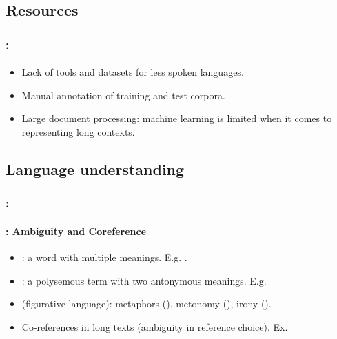 \documentclass[xcolor=table]{beamer}
\begin{document}
\subsection{Resources}

\begin{frame}
	\frametitle{\insertshortsubtitle: \insertsection}
	\framesubtitle{\insertsubsection}

	\begin{itemize}
		\item Lack of tools and datasets for less spoken languages.
		\item Manual annotation of training and test corpora.
		\item Large document processing: machine learning is limited when it comes to representing long contexts.
	\end{itemize}

\end{frame}

\subsection{Language understanding}

\begin{frame}
	\frametitle{\insertshortsubtitle: \insertsection}
	\framesubtitle{\insertsubsection: Ambiguity and Coreference}

	\begin{itemize}
		\item {}: a word with multiple meanings.
		E.g. .
		\item {}: a polysemous term with two antonymous meanings.
		E.g. 
		\item {} (figurative language): metaphors (), metonomy (), irony ().
		\item Co-references in long texts (ambiguity in reference choice).
		Ex. 
	\end{itemize}

\end{frame}
\end{document}
